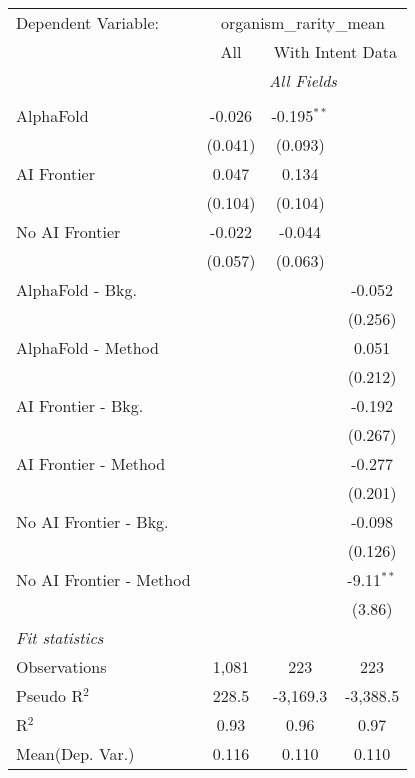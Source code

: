 \begingroup
\centering
\begin{tabular}{lccc}
   \tabularnewline \midrule \midrule
   Dependent Variable: & \multicolumn{3}{c}{organism\_rarity\_mean}\\
 & \multicolumn{1}{c}{All} & \multicolumn{2}{c}{With Intent Data} \\
\cmidrule(lr){2-2} \cmidrule(lr){3-4}
 & \multicolumn{3}{c}{\textit{All Fields}} \\ \\
   AlphaFold               & -0.026  & -0.195$^{**}$ &   \\   
                           & (0.041) & (0.093)       &   \\   
   AI Frontier             & 0.047   & 0.134         &   \\   
                           & (0.104) & (0.104)       &   \\   
   No AI Frontier          & -0.022  & -0.044        &   \\   
                           & (0.057) & (0.063)       &   \\   
   AlphaFold - Bkg.        &         &               & -0.052\\   
                           &         &               & (0.256)\\   
   AlphaFold - Method      &         &               & 0.051\\   
                           &         &               & (0.212)\\   
   AI Frontier - Bkg.      &         &               & -0.192\\   
                           &         &               & (0.267)\\   
   AI Frontier - Method    &         &               & -0.277\\   
                           &         &               & (0.201)\\   
   No AI Frontier - Bkg.   &         &               & -0.098\\   
                           &         &               & (0.126)\\   
   No AI Frontier - Method &         &               & -9.11$^{**}$\\   
                           &         &               & (3.86)\\   
   \midrule
   \emph{Fit statistics}\\
   Observations            & 1,081   & 223           & 223\\  
   Pseudo R$^2$            & 228.5   & -3,169.3      & -3,388.5\\  
   R$^2$                   & 0.93    & 0.96          & 0.97\\  
Mean(Dep. Var.) & 0.116 & 0.110 & 0.110 \\
   

\end{tabular}
